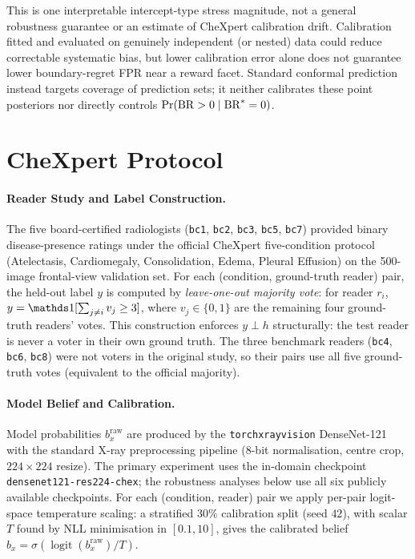 This is one interpretable intercept-type stress magnitude, not a general robustness guarantee or an estimate of CheXpert calibration drift.  Calibration fitted and evaluated on genuinely independent (or nested) data could reduce correctable systematic bias, but lower calibration error alone does not guarantee lower boundary-regret FPR near a reward facet.  Standard conformal prediction instead targets coverage of prediction sets; it neither calibrates these point posteriors nor directly controls $\Pr(\operatorname{BR}>0\mid\operatorname{BR}^{*}=0)$.

\section{CheXpert Protocol}
\label{app:exp2-protocol}

\paragraph{Reader Study and Label Construction.}
The five board-certified radiologists (\texttt{bc1}, \texttt{bc2}, \texttt{bc3}, \texttt{bc5}, \texttt{bc7}) provided binary disease-presence ratings under the official CheXpert five-condition protocol (Atelectasis, Cardiomegaly, Consolidation, Edema, Pleural Effusion) on the 500-image frontal-view validation set.
For each (condition, ground-truth reader) pair, the held-out label $y$ is computed by \emph{leave-one-out majority vote}: for reader $r_i$, $y = \Ind[\sum_{j \neq i} v_j \geq 3]$, where $v_j \in \{0,1\}$ are the remaining four ground-truth readers' votes.
This construction enforces $y \perp h$ structurally: the test reader is never a voter in their own ground truth.
The three benchmark readers (\texttt{bc4}, \texttt{bc6}, \texttt{bc8}) were not voters in the original study, so their pairs use all five ground-truth votes (equivalent to the official majority).

\paragraph{Model Belief and Calibration.}
Model probabilities $b_x^{\mathrm{raw}}$ are produced by the \texttt{torchxrayvision} DenseNet-121 \citep{Huang2017,Cohen2022} with the standard X-ray preprocessing pipeline (8-bit normalisation, centre crop, $224{\times}224$ resize).
The primary experiment uses the in-domain checkpoint \texttt{densenet121\allowbreak-res224\allowbreak-chex}; the robustness analyses below use all six publicly available checkpoints.
For each (condition, reader) pair we apply per-pair logit-space temperature scaling: a stratified $30\%$ calibration split (seed $42$), with scalar $T$ found by NLL minimisation in $[0.1,10]$, gives the calibrated belief $b_x = \sigma(\operatorname{logit}(b_x^{\mathrm{raw}})/T)$.

